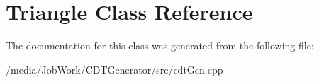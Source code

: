 \hypertarget{classTriangle}{\section{Triangle Class Reference}
\label{classTriangle}
}


The documentation for this class was generated from the following file\-:\begin{DoxyCompactItemize}
\item 
/media/\-Job\-Work/\-C\-D\-T\-Generator/src/cdt\-Gen.\-cpp\end{DoxyCompactItemize}

